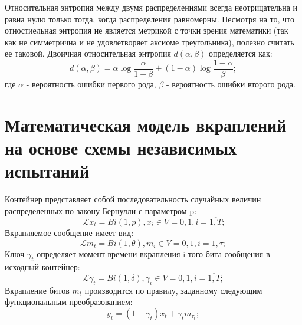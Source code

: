 \documentclass[a4paper,12pt]{article}
\theoremstyle{plain}
\begin{document}
Относительная энтропия между двумя распределениями всегда неотрицательна и равна нулю только тогда, когда распределения равномерны. Несмотря на то, что отностиельная энтропия не является метрикой с точки зрения математики (так как не симметрична и не удовлетворяет аксиоме треугольника), полезно считать ее таковой. Двоичная относительная энтропия $d(\alpha, \beta)$ определяется как:
	\begin{equation}
	d(\alpha, \beta) = \alpha \log \frac{\alpha}{1-\beta} + (1-\alpha)\log \frac{1-\alpha}{\beta};
	\end{equation}
где $\alpha$  - вероятность ошибки первого рода, $\beta$  - вероятность ошибки второго рода.

\newpage
\section{Математическая модель вкраплений на основе схемы независимых испытаний}

\vspace*{1cm}
Контейнер представляет собой последовательность случайных величин распределенных по закону Бернулли с параметром p:
\begin{equation}\label{container:eq}\
	\mathcal{L}{x_t} = Bi(1, p), x_i \in V = {0, 1}, i = \overline{1,T};
\end{equation}
Вкрапляемое сообщение имеет вид:
\begin{equation}
	\mathcal{L}{m_t} = Bi(1, \theta), m_i \in V = {0, 1}, i = \overline{1,\tau};
\end{equation}
Ключ $\gamma_t$ определяет момент времени вкрапления i-того бита сообщения в исходный контейнер:
\begin{equation}
	\mathcal{L}{\gamma_t} = Bi(1, \delta), \gamma_i \in V = {0, 1}, i = \overline{1,T};
\end{equation}
Вкрапление битов ${m_t}$ производится по правилу, заданному следующим функциональным преобразованием:
\begin{equation}\label{input:rule}
	y_t=(1-\gamma_t)x_t+\gamma_t m_{\tau_t};
\end{equation}
\end{document}
